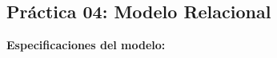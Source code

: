 \documentclass{report}
\begin{document}
	
	
	\begin{center}
		\section*{\LARGE{Práctica 04: Modelo Relacional}}
	\end{center}
    \vspace{.5cm}

        \LARGE{\textbf{Especificaciones del modelo:}}\\
        \normalsize
        

        

    \newpage
    
\printbibliography
  
\end{document}
